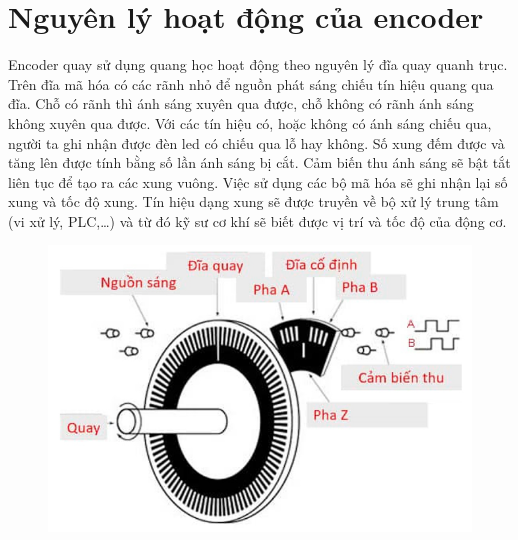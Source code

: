         \section{Nguyên lý hoạt động của encoder}
        Encoder quay sử dụng quang học hoạt động theo nguyên lý đĩa quay quanh trục. Trên đĩa mã hóa có các rãnh nhỏ để nguồn phát sáng chiếu tín hiệu quang qua đĩa. Chỗ có rãnh thì ánh sáng xuyên qua được, chỗ không có rãnh ánh sáng không xuyên qua được.
        Với các tín hiệu có, hoặc không có ánh sáng chiếu qua, người ta ghi nhận được đèn led có chiếu qua lỗ hay không. Số xung đếm được và tăng lên được tính bằng số lần ánh sáng bị cắt.
        Cảm biến thu ánh sáng sẽ bật tắt liên tục để tạo ra các xung vuông. Việc sử dụng các bộ mã hóa sẽ ghi nhận lại số xung và tốc độ xung. Tín hiệu dạng xung sẽ được truyền về bộ xử lý trung tâm (vi xử lý, PLC,…) và từ đó kỹ sư cơ khí sẽ biết được vị trí và tốc độ của động cơ.
        \begin{figure}[H]
            \centering
            \includegraphics[width=0.8\linewidth]{pictures/encoder6.png}
        \end{figure}
        
        \cleardoublepage